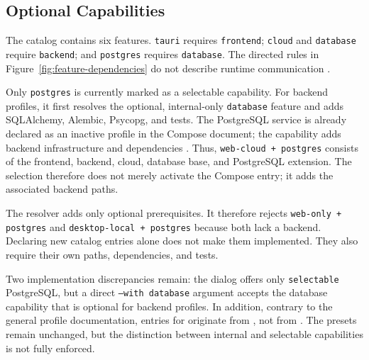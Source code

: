 \subsection{Optional Capabilities}
\label{subsec:optionale-capabilities}

The catalog contains six features. \texttt{tauri} requires
\texttt{frontend}; \texttt{cloud} and \texttt{database} require
\texttt{backend}; and \texttt{postgres} requires \texttt{database}. The
directed rules in Figure~\ref{fig:feature-dependencies} do not describe
runtime communication
\parencite{kleiveist2026profiles,kleiveist2026database}.



Only \texttt{postgres} is currently marked as a selectable capability. For
backend profiles, it first resolves the optional, internal-only
\texttt{database} feature and adds SQLAlchemy, Alembic, Psycopg, and tests. The
PostgreSQL service is already declared as an inactive profile in the Compose
document; the capability adds backend infrastructure and dependencies
\parencite{kleiveist2026deployment,kleiveist2026governance-snapshot}.
Thus, \texttt{web-cloud + postgres} consists of the frontend, backend, cloud,
database base, and PostgreSQL extension. The selection therefore does not
merely activate the Compose entry; it adds the associated backend paths.

The resolver adds only optional prerequisites. It therefore rejects
\texttt{web-only + postgres} and \texttt{desktop-local + postgres} because both
lack a backend. Declaring new catalog entries alone does not make them
implemented. They also require their own paths, dependencies, and tests.

Two implementation discrepancies remain: the dialog offers only
\texttt{selectable} PostgreSQL, but a direct \texttt{--with database} argument
accepts the database capability that is optional for backend profiles. In
addition, contrary to the general profile documentation, entries for
 originate from , not from
. The presets remain unchanged, but the distinction
between internal and selectable capabilities is not fully enforced.
